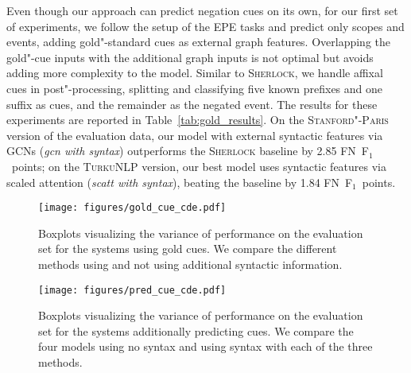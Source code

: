\documentclass[11pt,a4paper]{article}
\theoremstyle{plain}
\def\fscore{F$_1$}
\begin{document}
Even though our approach can predict negation cues on its own,
for our first set of experiments, we follow the setup of the EPE tasks
and predict only scopes and events, adding gold"-standard cues as
external graph features.
Overlapping the gold"-cue inputs with the additional graph inputs is
not optimal but avoids adding more complexity to the model.
Similar to \textsc{Sherlock}, we handle affixal cues in
post"-processing, splitting and classifying five known prefixes and
one suffix as cues, and the remainder as the negated event.
The results for these experiments are reported in
Table~\ref{tab:gold_results}.
On the \textsc{Stanford"-Paris} version of the evaluation data, our model with external syntactic features via GCNs (\emph{gcn with syntax}) outperforms the \textsc{Sherlock} baseline by 2.85 FN~\fscore\ points; on the \textsc{TurkuNLP} version, our best model uses syntactic features via scaled attention (\emph{scatt with syntax}), beating the baseline by 1.84 FN~\fscore\ points.

\begin{figure}[]
    \centering
        \texttt{[image: figures/gold\_cue\_cde.pdf]}
    \caption{Boxplots visualizing the variance of performance on the evaluation
        set for the systems using gold cues.
       We compare the  different methods using and not using additional
   syntactic information.}
    \label{fig:cde_gold}
\end{figure}
\begin{figure}[]
    \centering
        \texttt{[image: figures/pred\_cue\_cde.pdf]}
    \caption{Boxplots visualizing the variance of performance on the evaluation
        set for the systems additionally predicting cues.
       We compare the four models using no syntax and using syntax with each of
   the three methods.}
    \label{fig:cde_pred}
\end{figure}
\end{document}
